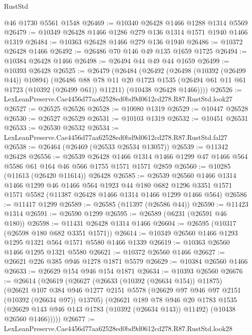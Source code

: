 \begin{lexlean}{RustStd}
\begin{coremodule}
{{    @46
    @1730
    @5561
    @1548
@26469 := @10340 @26428 @1466 @1288 @1314 @5569
@26479 := @10349 @26428 @1466 @1286 @279 @136 @1314 @1571 @1940 @1466 @1319
@26484 := @10363 @26428 @1466 @279 @136 @1940
@26486 := @10372 @26428 @1466
@26492 := @26486 @70 @146 @49 @135 @1659 @1725
@26494 := @10384 @26428 @1466
@26498 := @26494 @44 @49 @44 @1659
@26499 := @10393 @26428
@26525 := @26479
    (@26484
      (@26492
        (@26498 (@10392 (@26499 @44)) @10894)
        (@26486
          @88
          @78
          @11
          @20
          @1723
          @1535
          (@26494 @61 @11 @61 @1723 (@10392 (@26499 @61)) @11211)
          (@10438 @26428 @1466))))
@26526 := LexLeanPreserve.Cae4456d77aa62528ed0bd9d0612cd278.R87.RustStd.look27
@26527 := @26525 @26526
@26528 := @10080 @1319
@26529 := @10447 @26528
@26530 := @26527 @26529
@26531 := @10103 @1319
@26532 := @10451 @26531
@26533 := @26530 @26532
@26534 := LexLeanPreserve.Cae4456d77aa62528ed0bd9d0612cd278.R87.RustStd.fal27
@26538 := @26464 (@26469 (@26533 @26534 @13057))
@26539 := @11342 @26428
@26556 := @26539
    @26428
    @1466
    @1314
    @1466
    @1299
    @47
    @1466
    @564
    @5586
    @61
    @164
    @46
    @566
    @1755
    @1571
    @1571
    @2859
@26560 := @10285 (@11613 (@26420 @11614)) @26428
@26585 := @26539
    @26560
    @1466
    @1314
    @1466
    @1299
    @46
    @1466
    @564
    @1923
    @44
    @180
    @682
    @1296
    @3351
    @1571
    @1571
    @5582
    (@11387 @26428 @1466 @1314 @1466 @1299 @1466 @564)
@26586 := @11417 @1299
@26589 := @26585 (@11397 (@26586 @44))
@26590 := @11423 @1314
@26591 := @26590 @1299
@26595 := @26589 (@6231 (@26591 @46 @180))
@26598 := @11431 @26428 @1314 @1466
@26604 := @26595 (@10317 (@26598 @180 @682 @3351 @1571))
@26614 := @10349 @26560 @1466 @1293 @1295 @1321 @564 @1571 @5580 @1466 @1339
@26619 := @10363 @26560 @1466 @1295 @1321 @5580
@26621 := @10372 @26560 @1466
@26627 := @26621 @226 @385 @946 @1278 @1871 @5579
@26629 := @10384 @26560 @1466
@26633 := @26629 @154 @946 @154 @1871
@26634 := @10393 @26560
@26676 := @26614
    (@26619
      (@26627
        (@26633 (@10392 (@26634 @154)) @11875)
        (@26621
          @107
          @384
          @946
          @1277
          @2151
          @5578
          (@26629 @97 @946 @97 @2151 (@10392 (@26634 @97)) @13705)
          (@26621
            @189
            @78
            @946
            @20
            @1783
            @1535
            (@26629 @143 @946 @143 @1783 (@10392 (@26634 @143)) @11492)
            (@10438 @26560 @1466)))))
@26677 := LexLeanPreserve.Cae4456d77aa62528ed0bd9d0612cd278.R87.RustStd.look28
}}
\end{coremodule}
\end{lexlean}
